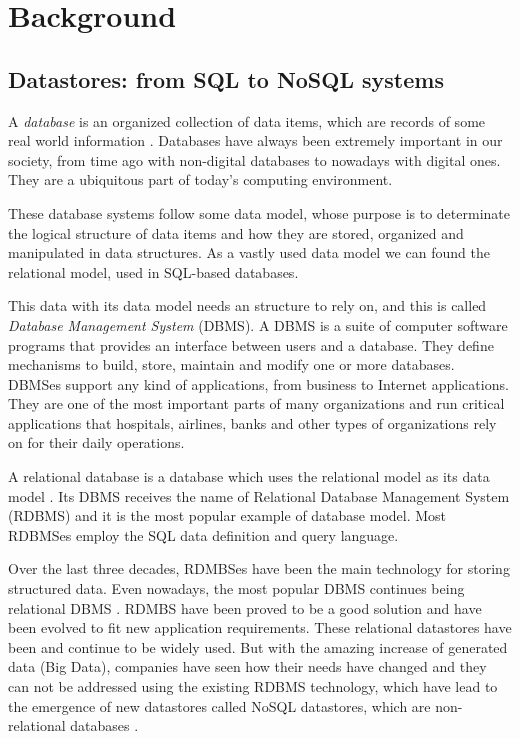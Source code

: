 \chapter{Background}
\label{chapter:background} 


\section{Datastores: from SQL to NoSQL systems}

A \textit{database} is an organized collection of data items, which are records of some real world information \cite{gray1993transaction}. Databases have always been extremely important in our society, from time ago with non-digital databases to nowadays with digital ones. They are a ubiquitous part of today's computing environment. 
\par
These database systems follow some data model, whose purpose is to determinate the logical structure of data items and how they are stored, organized and manipulated in data structures. As a vastly used data model we can found the relational model, used in SQL-based databases. 
\par
This data with its data model needs an structure to rely on, and this is called \textit{Database Management System} (DBMS). A DBMS is a suite of computer software programs that provides an interface between users and a database. They define mechanisms to build, store, maintain and modify one or more databases. 
DBMSes support any kind of applications, from business to Internet applications. They are one of the most important parts of many organizations and run critical applications that hospitals, airlines, banks and other types of organizations rely on for their daily operations.
\par
A relational database is a database which uses the relational model as its data model \cite{codd2001relational}. Its DBMS receives the name of Relational Database Management System (RDBMS) and it is the most popular example of database model. Most RDBMSes employ the SQL data definition and query language.
\par
Over the last three decades, RDMBSes have been the main technology for storing structured data. Even nowadays, the most popular DBMS continues being relational DBMS \cite{DBEnginesRanking}. RDMBS have been proved to be a good solution and have been evolved to fit new application requirements. These relational datastores have been and continue to be widely used. But with the amazing increase of generated data (Big Data), companies have seen how their needs have changed and they can not be addressed using the existing RDBMS technology, which have lead to the emergence of new datastores called NoSQL datastores, which are non-relational databases \cite{strauch2011nosql}.
